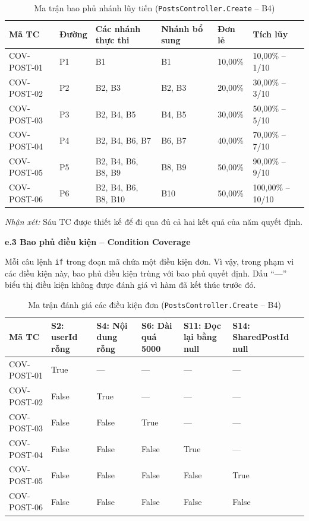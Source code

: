 \documentclass[11pt,a4paper]{article}
\begin{document}
\begin{table}[H]
\centering
\scriptsize
\begin{tabularx}{\textwidth}{|L{2.2cm}|C{1.1cm}|X|L{2.3cm}|C{1.4cm}|C{2.4cm}|}
\hline
{}
\textbf{Mã TC} & \textbf{Đường} & \textbf{Các nhánh thực thi} & \textbf{Nhánh bổ sung} & \textbf{Đơn lẻ} & \textbf{Tích lũy} \tabularnewline
\hline
COV-POST-01 & P1 & B1 & B1 & 10,00\% & 10,00\% -- 1/10 \\ \hline
COV-POST-02 & P2 & B2, B3 & B2, B3 & 20,00\% & 30,00\% -- 3/10 \\ \hline
COV-POST-03 & P3 & B2, B4, B5 & B4, B5 & 30,00\% & 50,00\% -- 5/10 \\ \hline
COV-POST-04 & P4 & B2, B4, B6, B7 & B6, B7 & 40,00\% & 70,00\% -- 7/10 \\ \hline
COV-POST-05 & P5 & B2, B4, B6, B8, B9 & B8, B9 & 50,00\% & 90,00\% -- 9/10 \\ \hline
COV-POST-06 & P6 & B2, B4, B6, B8, B10 & B10 & 50,00\% & 100,00\% -- 10/10 \\ \hline
\end{tabularx}
\caption{Ma trận bao phủ nhánh lũy tiến (\texttt{PostsController.Create} -- B4)}
\end{table}

\noindent\textit{Nhận xét:} Sáu TC được thiết kế để đi qua đủ cả hai kết quả của năm quyết định.

\noindent\textbf{e.3 Bao phủ điều kiện -- Condition Coverage}

\noindent Mỗi câu lệnh \texttt{if} trong đoạn mã chứa một điều kiện đơn. Vì vậy, trong phạm vi các điều kiện này, bao phủ điều kiện trùng với bao phủ quyết định. Dấu ``---'' biểu thị điều kiện không được đánh giá vì hàm đã kết thúc trước đó.

\begin{table}[H]
\centering
\small
\begin{tabularx}{\textwidth}{|L{2.5cm}|C{2.1cm}|C{2.1cm}|C{2.3cm}|C{2.4cm}|X|}
\hline
{}
\textbf{Mã TC} & \textbf{S2: userId rỗng} & \textbf{S4: Nội dung rỗng} & \textbf{S6: Dài quá 5000} & \textbf{S11: Đọc lại bằng null} & \textbf{S14: SharedPostId null} \tabularnewline
\hline
COV-POST-01 & True & --- & --- & --- & --- \\ \hline
COV-POST-02 & False & True & --- & --- & --- \\ \hline
COV-POST-03 & False & False & True & --- & --- \\ \hline
COV-POST-04 & False & False & False & True & --- \\ \hline
COV-POST-05 & False & False & False & False & True \\ \hline
COV-POST-06 & False & False & False & False & False \\ \hline
\end{tabularx}
\caption{Ma trận đánh giá các điều kiện đơn (\texttt{PostsController.Create} -- B4)}
\end{table}
\end{document}
